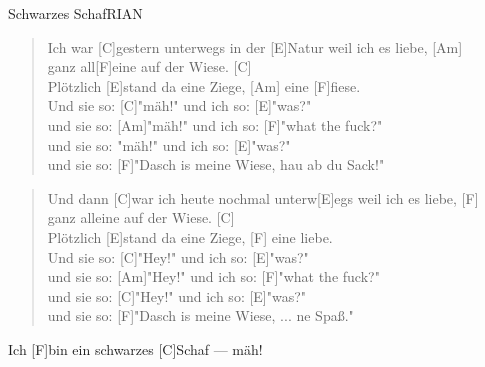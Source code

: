 \begin{song}{Schwarzes Schaf}{RIAN}

    \begin{verse}  
        Ich war [C]gestern unterwegs in der [E]Natur weil ich es liebe, [Am] \\
        ganz all[F]eine auf der Wiese. [C] \\
        Plötzlich [E]stand da eine Ziege, [Am] eine [F]fiese. \\
        Und sie so: [C]"mäh!" und ich so: [E]"was?" \\
        und sie so: [Am]"mäh!" und ich so: [F]"what the fuck?" \\
        und sie so: "mäh!" und ich so: [E]"was?" \\
        und sie so: [F]"Dasch is meine Wiese, hau ab du Sack!"
    \end{verse}  

    \begin{interlude}
        [C E Am F C E Am] 
    \end{interlude}

    \begin{verse}  
        Und dann [C]war ich heute nochmal unterw[E]egs weil ich es liebe, [F] \\
        ganz alleine auf der Wiese. [C] \\
        Plötzlich [E]stand da eine Ziege, [F] eine liebe. \\
        Und sie so: [C]"Hey!" und ich so: [E]"was?" \\
        und sie so: [Am]"Hey!" und ich so: [F]"what the fuck?" \\
        und sie so: [C]"Hey!" und ich so: [E]"was?" \\
        und sie so: [F]"Dasch is meine Wiese, ... ne Spaß."
    \end{verse}  

    \begin{interlude}
        [C E Am F (x3)]
    \end{interlude}

    \begin{outro}
        [C E] [Am]Ich [F]bin ein schwarzes [C]Schaf --- m\"ah!
    \end{outro}

\end{song}

